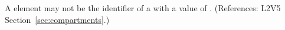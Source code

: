 A  element may not be the identifier of a
\Compartment with a  value
of .
(References: L2V5 Section~\ref{sec:compartments}.)
